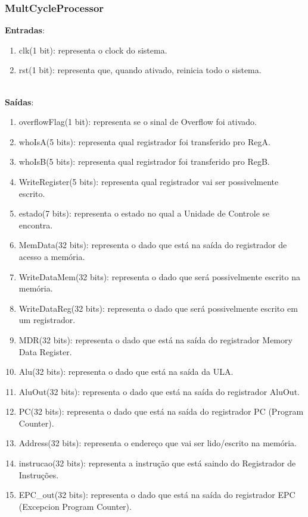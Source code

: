 \documentclass{article}
\begin{document}
     \subsubsection{MultCycleProcessor}
    \textbf{Entradas}:
    \begin{enumerate}
        \item clk(1 bit): representa o clock do sistema.
        \item rst(1 bit): representa que, quando ativado, reinicia todo o sistema.\\
    \end{enumerate}
\\
    \textbf{Saídas}:
    \begin{enumerate}
        \item overflowFlag(1 bit): representa se o sinal de Overflow foi ativado.
        \item whoIsA(5 bits): representa qual registrador foi transferido pro RegA.
        \item whoIsB(5 bits): representa qual registrador foi transferido pro RegB.
        \item WriteRegister(5 bits): representa qual registrador vai ser possivelmente escrito.
        \item estado(7 bits): representa o estado no qual a Unidade de Controle se encontra.
        \item MemData(32 bits): representa o dado que está na saída do registrador de acesso a memória.
        \item WriteDataMem(32 bits): representa o dado que será possivelmente escrito na memória.
        \item WriteDataReg(32 bits): representa o dado que será possivelmente escrito em um registrador.
        \item MDR(32 bits): representa o dado que está na saída do registrador Memory Data Register.
        \item Alu(32 bits): representa o dado que está na saída da ULA.
        \item AluOut(32 bits): representa o dado que está na saída do registrador AluOut.
        \item PC(32 bits): representa o dado que está na saída do registrador PC (Program Counter).
        \item Address(32 bits): representa o endereço que vai ser lido/escrito na memória.
        \item instrucao(32 bits): representa a instrução que está saindo do Registrador de Instruções.
        \item EPC\_out(32 bits): representa o dado que está na saída do registrador EPC (Excepcion Program Counter).\\
    \end{enumerate}\\
\end{document}
